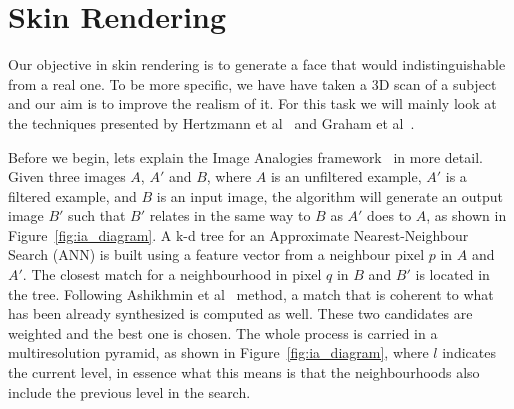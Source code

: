 \documentclass[11pt]{report}
\begin{document}
\section{Skin Rendering}

Our objective in skin rendering is to generate a face that would indistinguishable from a real one.
To be more specific, we have have taken a 3D scan of a subject and our aim is to improve the realism of it.
For this task we will mainly look at the techniques presented by Hertzmann et al~\cite{Hertzmann2001} and Graham et al~\cite{Graham2013}.

Before we begin, lets explain the Image Analogies framework~\cite{Hertzmann2001} in more detail.
Given three images $A$, $A'$ and $B$, where $A$ is an unfiltered example, $A'$ is a filtered example, and $B$ is an input image, the algorithm will generate an output image $B'$ such that $B'$ relates in the same way to $B$ as $A'$ does to $A$, as shown in Figure~\ref{fig:ia_diagram}.
A k-d tree for an Approximate Nearest-Neighbour Search (ANN) is built using a feature vector from a neighbour pixel $p$ in $A$ and $A'$.
The closest match for a neighbourhood in pixel $q$ in $B$ and $B'$ is located in the tree.
Following Ashikhmin et al~\cite{Ashikhmin2001} method, a match that is coherent to what has been already synthesized is computed as well.
These two candidates are weighted and the best one is chosen.
The whole process is carried in a multiresolution pyramid, as shown in Figure~\ref{fig:ia_diagram}, where $l$ indicates the current level, in essence what this means is that the neighbourhoods also include the previous level in the search.
\end{document}
